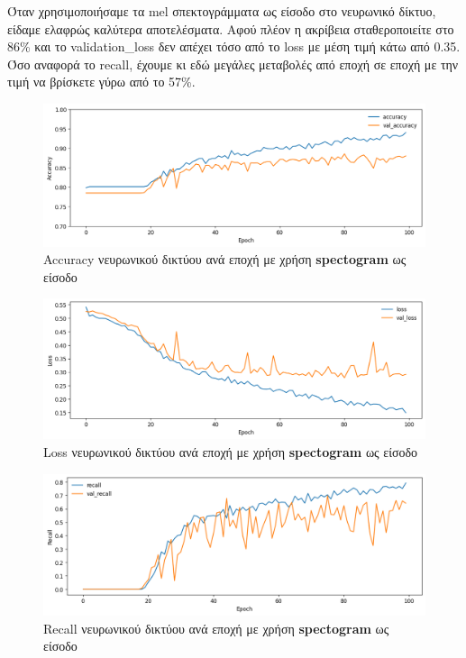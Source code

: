 \documentclass[../main.tex]{subfiles}
\begin{document}
Όταν χρησιμοποιήσαμε τα mel σπεκτογράμματα ως είσοδο στο νευρωνικό δίκτυο,
είδαμε ελαφρώς καλύτερα αποτελέσματα. Αφού πλέον η ακρίβεια σταθεροποιείτε στο
86\% και το validation\_loss δεν απέχει τόσο από το loss με μέση τιμή κάτω από
0.35. Όσο αναφορά το recall, έχουμε κι εδώ μεγάλες μεταβολές από εποχή σε εποχή
με την τιμή να βρίσκετε γύρω από το 57\%.

\begin{figure}[H]
	\center
	\includegraphics[width=\textwidth]{../images/spectogram_accuracy.png}
	\caption{Accuracy νευρωνικού δικτύου ανά εποχή με χρήση \textbf{spectogram} ως
		είσοδο}
	\label{spectogram_accuracy}
\end{figure}
\begin{figure}[H]
	\center
	\includegraphics[width=\textwidth]{../images/spectogram_loss.png}
	\caption{Loss νευρωνικού δικτύου ανά εποχή με χρήση \textbf{spectogram} ως
		είσοδο}
	\label{spectogram_loss}
\end{figure}
\begin{figure}[H]
	\center
	\includegraphics[width=\textwidth]{../images/spectogram_recall.png}
	\caption{Recall νευρωνικού δικτύου ανά εποχή με χρήση \textbf{spectogram} ως
		είσοδο}
	\label{spectogram_recall}
\end{figure}
\end{document}
